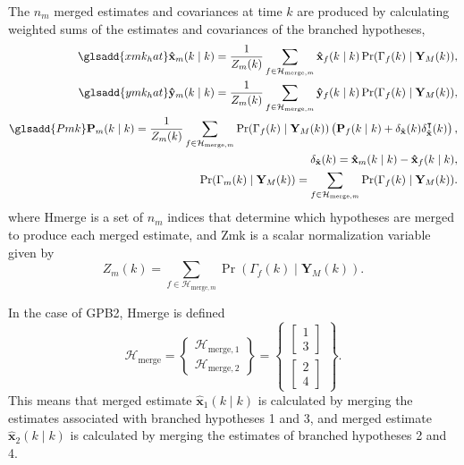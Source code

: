 The $n_m$ merged estimates and covariances at time $k$ are produced by calculating weighted sums of the estimates and covariances of the branched hypotheses,
\begin{equation} \label{eq:xmkymk_hat_MKF}
	\begin{aligned}
		\glsadd{xmk_hat}\mathbf{\hat{x}}_m(k \mid k) = \frac{1}{Z_m(k)} \sum_{f \in \mathcal{H}_{\text{merge},m}} \mathbf{\hat{x}}_f(k \mid k) \Pr(\Gamma_f(k) \mid \mathbf{Y}_M(k)), \\
		\glsadd{ymk_hat}\mathbf{\hat{y}}_m(k \mid k) = \frac{1}{Z_m(k)} \sum_{f \in \mathcal{H}_{\text{merge},m}} \mathbf{\hat{y}}_f(k \mid k) \Pr(\Gamma_f(k) \mid \mathbf{Y}_M(k)),\\
		\glsadd{Pmk}\mathbf{P}_m(k \mid k) = \frac{1}{Z_m(k)} \sum_{f \in \mathcal{H}_{\text{merge},m}} \Pr(\Gamma_f(k) \mid \mathbf{Y}_M(k)) \left( \mathbf{P}_f(k \mid k) + \delta_\mathbf{\hat{x}}(k) \delta_\mathbf{\hat{x}}^\intercal(k) \right), \\
		\delta_\mathbf{\hat{x}}(k) = \mathbf{\hat{x}}_m(k \mid k) - \mathbf{\hat{x}}_f(k \mid k), \\
		\Pr(\Gamma_m(k) \mid \mathbf{Y}_M(k)) = \sum_{f \in \mathcal{H}_{\text{merge},m}} \Pr(\Gamma_f(k) \mid \mathbf{Y}_M(k)).
	\end{aligned}
\end{equation}
%
where \gls{Hmerge} is a set of $n_m$ indices that determine which hypotheses are merged to produce each merged estimate, and \gls{Zmk} is a scalar normalization variable given by
\begin{equation} \label{eq:Zmk}
	Z_m(k) = \sum_{f \in \mathcal{H}_{\text{merge},m}} \Pr(\Gamma_f(k) \mid \mathbf{Y}_M(k)).
\end{equation}

In the case of \gls{GPB2}, \gls{Hmerge} is defined
\begin{equation} \label{eq:Hmerge_GPB2}
	\mathcal{H}_{\text{merge}} = \begin{Bmatrix} \mathcal{H}_{\text{merge},1} \\ \mathcal{H}_{\text{merge},2} \end{Bmatrix} = \begin{Bmatrix}
		\begin{bmatrix}	1 \\ 3 \end{bmatrix} \\
		\begin{bmatrix}	2 \\ 4 \end{bmatrix}
	\end{Bmatrix}.
\end{equation}
This means that merged estimate $\mathbf{\hat{x}}_1(k \mid k)$ is calculated by merging the estimates associated with branched hypotheses 1 and 3, and merged estimate $\mathbf{\hat{x}}_2(k \mid k)$ is calculated by merging the estimates of branched hypotheses 2 and 4.

